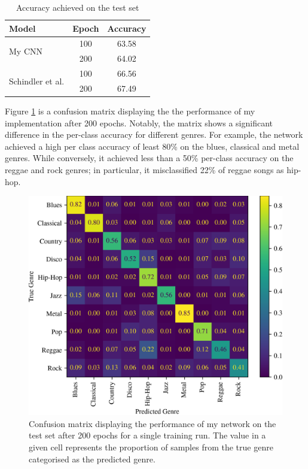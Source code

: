 \documentclass[conference]{IEEEtran}
\begin{document}
\begin{table}[htbp]
    \caption{Accuracy achieved on the test set}
    \begin{center}
    \begin{tabular}{l c c}
    \toprule
    \textbf{Model}&\textbf{Epoch}&\textbf{Accuracy}\\
    \midrule
    \multirow{ 2}{*}{My CNN} & 100 & 63.58 \\
    & 200 & 64.02 \\
    \midrule
    \multirow{ 2}{*}{Schindler et al.} & 100 & 66.56\\
    & 200 & 67.49 \\
    \bottomrule
    \end{tabular}
    \label{shallow_results}
    \end{center}
\end{table}

Figure \ref{confusion_matrix} is a confusion matrix displaying the the performance of my implementation after 200 epochs.
Notably, the matrix shows a significant difference in the per-class accuracy for different genres.
For example, the network achieved a high per class accuracy of least 80\% on the blues, classical and metal genres.
While conversely, it achieved less than a 50\% per-class accuracy on the reggae and rock genres; in particular, it misclassified 22\% of reggae songs as hip-hop.

\begin{figure}[htbp]
    \centerline{\includegraphics[width=\columnwidth]{cm.png}}
    \caption{
        Confusion matrix displaying the performance of my network on the test set after 200 epochs for a single training run.    
        The value in a given cell represents the proportion of samples from the true genre categorised as the predicted genre.
    }
    \label{confusion_matrix}
\end{figure}
\end{document}
